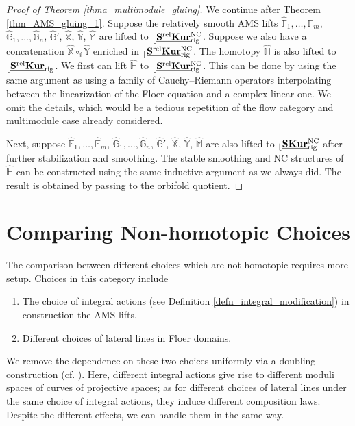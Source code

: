 \documentclass[reqno, 10pt]{amsart}
\numberwithin{equation}{section}
\numberwithin{equation}{section}
\theoremstyle{definition}
\theoremstyle{remark}
\newcommand{\mb}{\mathbb}
\renewcommand{\outer}{{}_{\lfloor}}
\newcommand{\uds}[1]{\underline{\smash{#1}}}
\begin{document}
\begin{proof}[Proof of Theorem \ref{thma_multimodule_gluing}]
We continue after Theorem \ref{thm_AMS_gluing_1}. Suppose the relatively smooth AMS lifts $\hat {\mb F}_1, \ldots, \hat {\mb F}_m$, $\hat {\mb G}_1, \ldots, \hat {\mb G}_n$, $\hat {\mb G}'$, $\hat {\mb X}$, $\hat {\mb Y}$, $\hat {\mb M}$ are lifted to $\outer \uds{\bf S^{\rm rel} Kur}_{\rm rig}^{\rm NC}$. Suppose we also have a concatenation $\hat {\mb X} \circ_i \hat {\mb Y}$ enriched in $\outer \uds{\bf S^{\rm rel} Kur}_{\rm rig}^{\rm NC}$. The homotopy $\hat{\mb H}$ is also lifted to $\outer \uds{\bf S^{\rm rel} Kur}_{\rm rig}$. We first can lift $\hat {\mb H}$ to $\outer \uds{\bf S^{\rm rel} Kur}_{\rm rig}^{\rm NC}$. This can be done by using the same argument as using a family of Cauchy--Riemann operators interpolating between the linearization of the Floer equation and a complex-linear one. We omit the details, which would be a tedious repetition of the flow category and multimodule case already considered. 

Next, suppose $\hat {\mb F}_1, \ldots, \hat {\mb F}_m$, $\hat {\mb G}_1, \ldots, \hat {\mb G}_n$, $\hat {\mb G}'$, $\hat {\mb X}$, $\hat {\mb Y}$, $\hat {\mb M}$ are also lifted to $\outer \uds{\bf SKur}_{\rm rig}^{\rm NC}$ after further stabilization and smoothing. The stable smoothing and NC structures of $\hat {\mb H}$ can be constructed using the same inductive argument as we always did. The result is obtained by passing to the orbifold quotient.
\end{proof}


\section{Comparing Non-homotopic Choices}\label{section_comparison}

The comparison between different choices which are not homotopic requires more setup. Choices in this category include
\begin{enumerate}
    \item The choice of integral actions (see Definition \ref{defn_integral_modification}) in construction the AMS lifts.

    \item Different choices of lateral lines in Floer domains.

\end{enumerate}

We remove the dependence on these two choices uniformly via a doubling construction (cf. \cite[Section 6.10]{AMS}). Here, different integral actions give rise to different moduli spaces of curves of projective spaces; as for different choices of lateral lines under the same choice of integral actions, they induce different composition laws. Despite the different effects, we can handle them in the same way.
\end{document}
